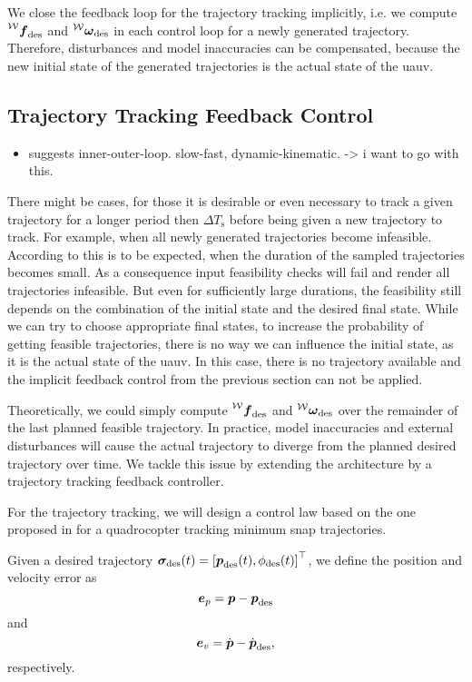 We close the feedback loop for the trajectory tracking implicitly, i.e. we compute $\thrustdesiredworld$ and $\vangdesiredworld$ in each control loop for a newly generated trajectory.
Therefore, disturbances and model inaccuracies can be compensated, because the new initial state of the generated trajectories is the actual state of the \ac{uauv}.

\subsection{Trajectory Tracking Feedback Control}
\begin{itemize}
	\item \cite{Maurya09} suggests inner-outer-loop. slow-fast, dynamic-kinematic. -> i want to go with this.
\end{itemize}
There might be cases, for those it is desirable or even necessary to track a given trajectory for a longer period then $\Delta T_{\text{s}}$ before being given a new trajectory to track.
For example, when all newly generated trajectories become infeasible. According to \cite{MuellerHehn15} this is to be expected, when the duration of the sampled trajectories becomes small.
As a consequence input feasibility checks will fail and render all trajectories infeasible.
But even for sufficiently large durations, the feasibility still depends on the combination of the initial state and the desired final state.
While we can try to choose appropriate final states, to increase the probability of getting feasible trajectories, there is no way we can influence the initial state, as it is the actual state of the \ac{uauv}.
In this case, there is no trajectory available and the implicit feedback control from the previous section can not be applied.

Theoretically, we could simply compute $\thrustdesiredworld$ and $\vangdesiredworld$ over the remainder of the last planned feasible trajectory.
In practice, model inaccuracies and external disturbances will cause the actual trajectory to diverge from the planned desired trajectory over time.
We tackle this issue by extending the architecture by a trajectory tracking feedback controller.

For the trajectory tracking, we will design a control law based on the one proposed in \cite{MellingerKumar11} for a quadrocopter tracking minimum snap trajectories.

Given a desired trajectory $\bm{\sigma}_{\text{des}}(t) = \left[\mbox{$\bm{p}$}_{\text{des}}(t), \phi_{\text{des}}(t)\right]^\top$, we define the position and velocity error as
\begin{equation}
	\mbox{$\bm{e}$}_{p} = \mbox{$\bm{p}$} - \mbox{$\bm{p}$}_{\text{des}}
\end{equation}
and
\begin{equation}
	\mbox{$\bm{e}$}_{v} = \mbox{$\dot{\bm{p}}$} - \mbox{$\dot{\bm{p}}$}_{\text{des}}
	,
\end{equation}
respectively.

